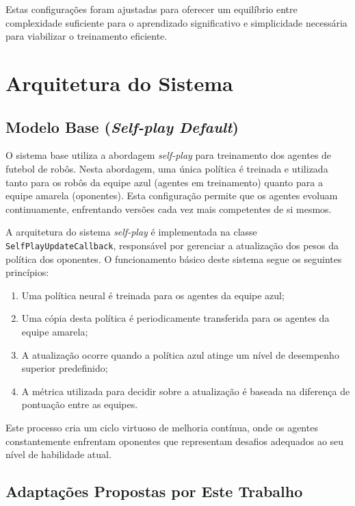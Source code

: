 Estas configurações foram ajustadas para oferecer um equilíbrio entre complexidade suficiente para o aprendizado significativo e simplicidade necessária para viabilizar o treinamento eficiente.

\section{Arquitetura do Sistema}
\label{sec:arquitetura_sistema}

\subsection{Modelo Base (\textit{Self-play Default})}

O sistema base utiliza a abordagem \textit{self-play} para treinamento dos agentes de futebol de robôs. Nesta abordagem, uma única política é treinada e utilizada tanto para os robôs da equipe azul (agentes em treinamento) quanto para a equipe amarela (oponentes). Esta configuração permite que os agentes evoluam continuamente, enfrentando versões cada vez mais competentes de si mesmos.

A arquitetura do sistema \textit{self-play} é implementada na classe \texttt{SelfPlayUpdateCallback}, responsável por gerenciar a atualização dos pesos da política dos oponentes. O funcionamento básico deste sistema segue os seguintes princípios:

\begin{enumerate}
    \item Uma política neural é treinada para os agentes da equipe azul;
    \item Uma cópia desta política é periodicamente transferida para os agentes da equipe amarela;
    \item A atualização ocorre quando a política azul atinge um nível de desempenho superior predefinido;
    \item A métrica utilizada para decidir sobre a atualização é baseada na diferença de pontuação entre as equipes.
\end{enumerate}

Este processo cria um ciclo virtuoso de melhoria contínua, onde os agentes constantemente enfrentam oponentes que representam desafios adequados ao seu nível de habilidade atual.

\subsection{Adaptações Propostas por Este Trabalho}

